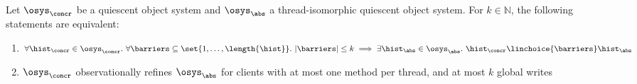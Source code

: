 \begin{theorem}
Let $\osys_\concr$ be a quiescent object system and $\osys_\abs$ a 
thread-isomorphic quiescent object system. For $k \in \mathbb{N}$, the 
following statements are equivalent:
\begin{enumerate}
\item \label{ebbl}
  $ \forall \hist_\concr \in \osys_\concr.\ 
      \forall \barriers \subseteq \set{1,\dots,\length{\hist}}.\ 
        |\barriers| \leq k \implies
          \exists \hist_\abs \in \osys_\abs.\ 
            \hist_\concr \linchoice{\barriers} \hist_\abs$
\item \label{or-one}
  $ \osys_\concr$ observationally refines $\osys_\abs$ for clients with 
  at most one method per thread, and at most $k$ global writes
\end{enumerate}
\end{theorem}


